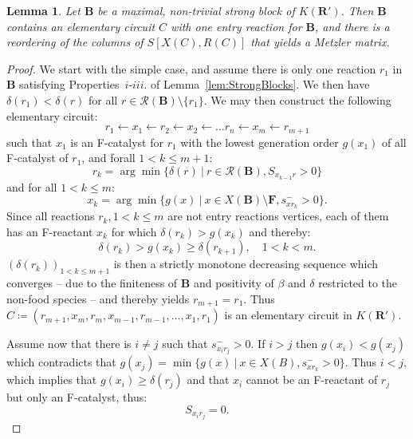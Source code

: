 \documentclass[pdflatex]{sn-jnl}
\theoremstyle{thmstyleone}%
\newtheorem{lemma}[theorem]{Lemma}%
\theoremstyle{examplesty}%
\theoremstyle{thmstylethree}%
\newcommand{\king}{K}
\newcommand{\food}{\ensuremath{\mathbf{F}}}
\newcommand{\SM}{S}
\newcommand{\CR}[0]{\mathcal{R}}
\newcommand{\RAF}[0]{\mathbf{R}'}
\newcommand{\block}[0]{\mathbf{B}}
\newcommand{\sgen}{g}
\newcommand{\crgen}{\delta}
\newcommand{\holy}[1]{\begingroup\color{royalpurple}#1\endgroup}
\begin{document}
\vspace{6pt}
\begin{lemma}\label{lem:MetzCircuit}
  \holy{Let $\block$ be a maximal, non-trivial strong block of $\king(\RAF)$. Then $\block$ contains an elementary circuit $C$ with one entry reaction for $\block$, and there is a reordering of the columns of $\SM[X(C), R(C)]$ that yields a Metzler matrix.}
\end{lemma}
\begin{proof}
	\holy{We start with the simple case, and assume there is only one reaction $r_1$ in $\block$ satisfying Properties~$i$-$iii.$ of Lemma~\ref{lem:StrongBlocks}. We then have $\crgen(r_1)<\crgen(r)$ for all $r\in \CR(\block) \setminus \{r_1\}$. We may then construct the following elementary circuit:
	\begin{equation}
		r_1 \leftarrow x_1 \leftarrow r_2 \leftarrow x_2 \leftarrow \ldots r_n
		\leftarrow x_m \leftarrow r_{m+1}
	\end{equation}
	such that $x_1$ is an F-catalyst for $r_1$ with the lowest generation order $\sgen(x_1)$ of all F-catalyst of $r_1$, and forall $1< k\leq m+1$: 
	\begin{equation}
		r_k =  \arg \min \{ \crgen(r) \ \vert \ r\in \CR(\block), \SM_{x_{k-1}r}>0\}
	\end{equation}
	and for all $1<k\leq m$:
	\begin{equation}
		x_k = \arg \min \{\sgen(x) \ \vert \ x\in X(\block)\setminus \food, s^-_{xr_k}>0\}.
	\end{equation}
	Since all reactions $r_k, 1< k\leq m$ are not entry reactions vertices, each of them has an F-reactant $x_k$ for which
	$\crgen(r_k)>\sgen(x_k)$ and thereby:
	\begin{equation}
		\crgen(r_k) > \sgen(x_k) \geq \crgen(r_{k+1}), \quad 1< k < m.
	\end{equation}
	$(\crgen(r_k))_{1< k\leq m+1}$ is then a strictly monotone decreasing sequence which converges -- due to the finiteness of $\block$ and positivity of $\beta$ and $\delta$ restricted to the non-food species -- and thereby yields $r_{m+1}=r_1$.  Thus $C\coloneqq (r_{m+1}, x_m, r_m, x_{m-1}, r_{m-1},\ldots, x_1,r_1)$ is an elementary circuit in $\king(\RAF)$.
	
	Assume now that there is $i\neq j$ such that $s^-_{x_ir_j}>0$. If $i>j$ then $\sgen(x_i)<\sgen(x_j)$ which contradicts that $\sgen(x_j)=\min \{\sgen(x) \ \vert \ x\in X(B), s^-_{xr_k}>0\}$. Thus $i<j$, which implies that $\sgen(x_i)\geq\delta(r_j)$ and that $x_i$ cannot be an F-reactant of $r_j$ but only an F-catalyst, thus:
	\begin{equation}
		\SM_{x_ir_j}=0.
	\end{equation} 

}
\end{proof}
\end{document}
